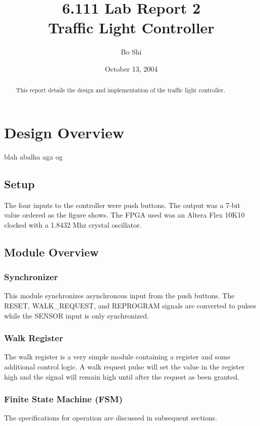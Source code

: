\documentclass{article}
\author{Bo Shi}
\title{6.111 Lab Report 2 \\ Traffic Light Controller}
\date{October 13, 2004}
\begin{document}
\maketitle

\begin{abstract}
This report details the design and implementation of the traffic light controller.
\end{abstract}

\newpage
\tableofcontents

\newpage
\listoffigures 
\listoftables 

\newpage
\section{Design Overview}
	blah abalha aga og

	\subsection{Setup}
		The four inputs to the controller were push buttons.  The
		output was a 7-bit value ordered as the figure shows.
		The FPGA used was an Altera Flex 10K10 clocked with a 1.8432 Mhz
		crystal oscillator.
	

	\subsection{Module Overview}
		\subsubsection{Synchronizer}
			This module synchronizes asynchronous input from the
			push buttons.  The RESET, WALK\_REQUEST, and REPROGRAM
			signals are converted to pulses while the SENSOR input
			is only synchronized.

		\subsubsection{Walk Register}
			The walk register is a very simple module containing a
			register and some additional control logic.  A walk
			request pulse will set the value in the register high
			and the signal will remain high until after the request
			as been granted.

		\subsubsection{Finite State Machine (FSM)}
			The specifications for operation are discussed in
			subsequent sections.
\end{document}
